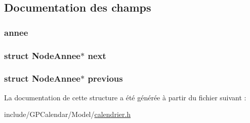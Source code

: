 \subsection{Documentation des champs}
\hypertarget{struct_node_annee_aa0898ccf3eb95fa2dc84150d887b55c1}{
\subsubsection[{annee}]{ annee}}\label{struct_node_annee_aa0898ccf3eb95fa2dc84150d887b55c1}
\hypertarget{struct_node_annee_a1cb22d42269d482585fba555db38334e}{
\subsubsection[{next}]{\setlength{\rightskip}{0pt plus 5cm}struct {\bf Node\-Annee}$\ast$ next}}\label{struct_node_annee_a1cb22d42269d482585fba555db38334e}
\hypertarget{struct_node_annee_aebffe5024c759df4300746c6b1034ed3}{
\subsubsection[{previous}]{\setlength{\rightskip}{0pt plus 5cm}struct {\bf Node\-Annee}$\ast$ previous}}\label{struct_node_annee_aebffe5024c759df4300746c6b1034ed3}


La documentation de cette structure a été générée à partir du fichier suivant \-:\begin{DoxyCompactItemize}
\item 
include/\-G\-P\-Calendar/\-Model/\hyperlink{calendrier_8h}{calendrier.\-h}\end{DoxyCompactItemize}

